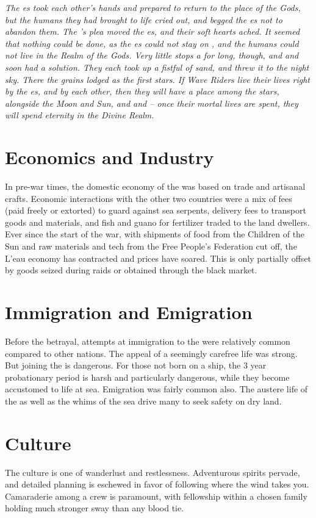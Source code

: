 \documentclass[blue]{GL2020}
\begin{document}
\emph{The \cEbb{\God}es took each other's hands and prepared to return to the place of the Gods, but the humans they had brought to life cried out, and begged the \cEbb{\God}es not to abandon them. The \pShippies{}'s plea moved the \cEbb{\God}es, and their soft hearts ached. It seemed that nothing could be done, as the \cEbb{\God}es could not stay on \pEarth{}, and the humans could not live in the Realm of the Gods. Very little stops a \cEbb{\God} for long, though, and \cEbb{} and \cFlow{} soon had a solution. They each took up a fistful of sand, and threw it to the night sky. There the grains lodged as the first stars. If Wave Riders live their lives right by the \cEbb{\God}es, and by each other, then they will have a place among the stars, alongside the Moon and Sun, and \cEbb{} and \cFlow{} – once their mortal lives are spent, they will spend eternity in the Divine Realm.}

\section*{Economics and Industry}
In pre-war times, the domestic economy of the \pShip{} was based on trade and artisanal crafts. Economic interactions with the other two countries were a mix of fees (paid freely or extorted) to guard against sea serpents, delivery fees to transport goods and materials, and fish and guano for fertilizer traded to the land dwellers. Ever since the start of the war, with shipments of food from the Children of the Sun and raw materials and tech from the Free People's Federation cut off, the L'eau economy has contracted and prices have soared. This is only partially offset by goods seized during raids or obtained through the black market.

\section*{Immigration and Emigration}
Before the betrayal, attempts at immigration to the \pShip{} were relatively common compared to other nations. The appeal of a seemingly carefree life was strong. But joining the \pShippies{} is dangerous. For those not born on a ship, the 3 year probationary period is harsh and particularly dangerous, while they become accustomed to life at sea. Emigration was fairly common also. The austere life of the \pShip{} as well as the whims of the sea drive many to seek safety on dry land.

\section*{Culture}
The \pShip{} culture is one of wanderlust and restlessness. Adventurous spirits pervade, and detailed planning is eschewed in favor of following where the wind takes you. Camaraderie among a crew is paramount, with fellowship within a chosen family holding much stronger sway than any blood tie.
\end{document}
